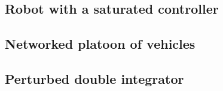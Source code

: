 \subsection{Robot with a saturated controller}


\subsection{Networked platoon of vehicles}



\subsection{Perturbed double integrator}

